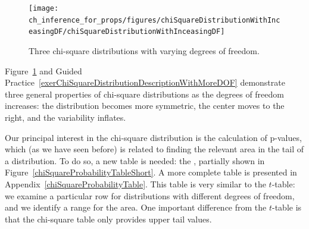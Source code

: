 \begin{figure}[h]
\centering
\texttt{[image: ch\_inference\_for\_props/figures/chiSquareDistributionWithInceasingDF/chiSquareDistributionWithInceasingDF]}
\caption{Three chi-square distributions with varying degrees of freedom.}
\label{chiSquareDistributionWithInceasingDF}
\end{figure}

Figure~\ref{chiSquareDistributionWithInceasingDF} and Guided Practice~\ref{exerChiSquareDistributionDescriptionWithMoreDOF} demonstrate three general properties of chi-square distributions as the degrees of freedom increases: the distribution becomes more symmetric, the center moves to the right, and the variability inflates.

Our principal interest in the chi-square distribution is the calculation of p-values, which (as we have seen before) is related to finding the relevant area in the tail of a distribution. To do so, a new table is needed: the , partially shown in Figure~\ref{chiSquareProbabilityTableShort}. A more complete table is presented in Appendix~\ref{chiSquareProbabilityTable}. This table is very similar to the $t$-table: we examine a particular row for distributions with different degrees of freedom, and we identify a range for the area. One important difference from the $t$-table is that the chi-square table only provides upper tail values.

